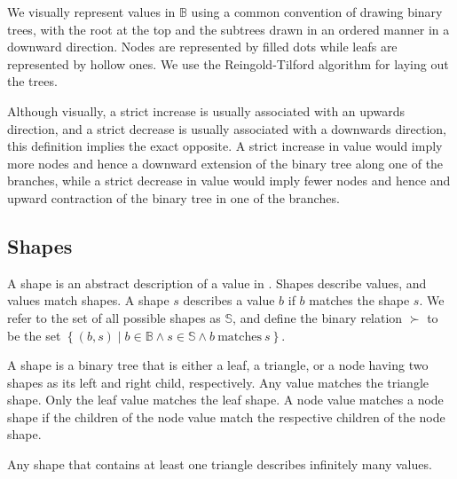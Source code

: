 \begin{definition}\label{definition:value-visualization} We visually represent
values in $\mathbb{B}$ using a common convention of drawing binary trees, with
the root at the top and the subtrees drawn in an ordered manner in a downward
direction. Nodes are represented by filled dots while leafs are represented by
hollow ones. We use the Reingold-Tilford algorithm\cite{reingold-tilford} for
laying out the trees.\end{definition}


Although visually, a strict increase is usually associated with an upwards
direction, and a strict decrease is usually associated with a downwards
direction, this definition implies the exact opposite. A strict increase in
value would imply more nodes and hence a downward extension of the binary tree
along one of the branches, while a strict decrease in value would imply fewer
nodes and hence and upward contraction of the binary tree in one of the
branches.

\subsection{Shapes}

\begin{definition}\label{definition:shape} A shape is an abstract description
of a value in \D{}. Shapes describe values, and values match shapes. A shape
$s$ describes a value $b$ if $b$ matches the shape $s$. We refer to the set of
all possible shapes as $\mathbb{S}$, and define the binary relation $\succ$ to
be the set $\left\{(b,s)\mid b\in\mathbb{B} \wedge s\in\mathbb{S} \wedge b\
\text{matches}\ s\right\}$.\end{definition}

\begin{definition}\label{definition:value-matches-shape} A shape is a binary
tree that is either a leaf, a triangle, or a node having two shapes as its left
and right child, respectively. Any value matches the triangle shape. Only the
leaf value matches the leaf shape. A node value matches a node shape if the
children of the node value match the respective children of the node
shape.\end{definition}

\begin{lemma} Any shape that contains at least one triangle describes
infinitely many values.\end{lemma}


